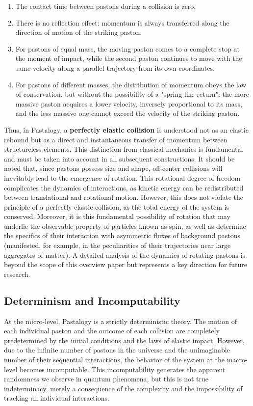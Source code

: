 \documentclass[pdflatex,sn-mathphys-num,referee]{sn-jnl}
\begin{document}
\begin{enumerate}
  \item The contact time between pastons during a collision is zero.
  \item There is no reflection effect: momentum is always transferred along the direction of motion of the striking paston.
  \item For pastons of equal mass, the moving paston comes to a complete stop at the moment of impact, while the second paston continues to move with the same velocity along a parallel trajectory from its own coordinates.
  \item For pastons of different masses, the distribution of momentum obeys the law of conservation, but without the possibility of a "spring-like return": the more massive paston acquires a lower velocity, inversely proportional to its mass, and the less massive one cannot exceed the velocity of the striking paston.
\end{enumerate}

Thus, in Pastalogy, a \textbf{perfectly elastic collision} is understood not as an elastic rebound but as a direct and instantaneous transfer of momentum between structureless elements. This distinction from classical mechanics is fundamental and must be taken into account in all subsequent constructions. It should be noted that, since pastons possess size and shape, off-center collisions will inevitably lead to the emergence of rotation. This rotational degree of freedom complicates the dynamics of interactions, as kinetic energy can be redistributed between translational and rotational motion. However, this does not violate the principle of a perfectly elastic collision, as the total energy of the system is conserved. Moreover, it is this fundamental possibility of rotation that may underlie the observable property of particles known as spin, as well as determine the specifics of their interaction with asymmetric fluxes of background pastons (manifested, for example, in the peculiarities of their trajectories near large aggregates of matter). A detailed analysis of the dynamics of rotating pastons is beyond the scope of this overview paper but represents a key direction for future research.

\subsection{Determinism and Incomputability}\label{subsec:determinism}

At the micro-level, Pastalogy is a strictly deterministic theory. The motion of each individual paston and the outcome of each collision are completely predetermined by the initial conditions and the laws of elastic impact. However, due to the infinite number of pastons in the universe and the unimaginable number of their sequential interactions, the behavior of the system at the macro-level becomes incomputable. This incomputability generates the apparent randomness we observe in quantum phenomena, but this is not true indeterminacy, merely a consequence of the complexity and the impossibility of tracking all individual interactions.
\end{document}
